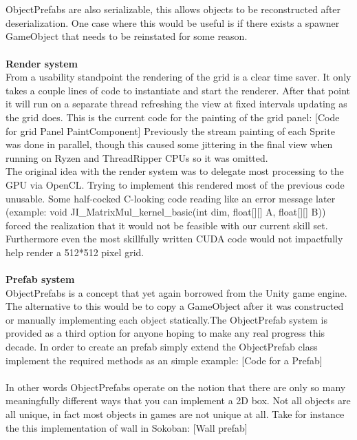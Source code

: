 \documentclass[main.tex]{subfiles}
\begin{document}
\\ \\
ObjectPrefabs are also serializable, this allows objects to be reconstructed after deserialization. One case where this would be useful is if there exists a spawner GameObject that needs to be reinstated for some reason. 
\\ \\
\textbf{Render system} \\%
From a usability standpoint the rendering of the grid is a clear time saver. It only takes a couple lines of code to instantiate and start the renderer. After that point it will run on a separate thread refreshing the view at fixed intervals updating as the grid does. This is the current code for the painting of the grid panel:
	[Code for grid Panel PaintComponent]
Previously the stream painting of each Sprite was done in parallel, though this caused some jittering in the final view when running on Ryzen and ThreadRipper CPUs so it was omitted.
\\
The original idea with the render system was to delegate most processing to the GPU via OpenCL. Trying to implement this rendered most of the previous code unusable. Some half-cocked C-looking code reading like an error message later (example: void JI\_MatrixMul\_kernel\_basic(int dim, float[][] A, float[][] B){})  forced the realization that it would not be feasible with our current skill set. Furthermore even the most skillfully written CUDA code would not impactfully help render a 512*512 pixel grid.
\\ \\
\textbf{Prefab system} \\%
ObjectPrefabs is a concept that yet again borrowed from the Unity game engine. 
The alternative to this would be to copy a GameObject after it was constructed or manually implementing each object statically.The ObjectPrefab system is provided as a third option for anyone hoping to make any real progress this decade. In order to create an prefab simply extend the ObjectPrefab class implement the required methods as an simple example:
	[Code for a Prefab]
\\ \\
In other words ObjectPrefabs operate on the notion that there are only so many meaningfully different ways that you can implement a 2D box. Not all objects are all unique, in fact most objects in games are not unique at all. Take for instance the this implementation of wall in Sokoban: 
	[Wall prefab]
\\ \\
\end{document}
